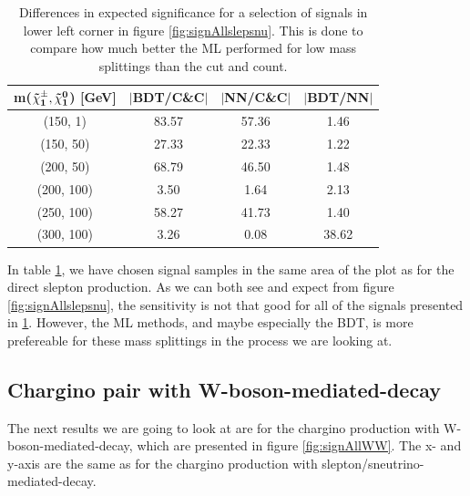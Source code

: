 \begin{table}[H]
    \centering
    \begin{tabular}{c c c c}
    \toprule
    \textbf{m($\mathbf{\Tilde{\chi}_1^\pm, \Tilde{\chi}_1^0}$) [GeV]} & \textbf{$|$BDT/C\&C$|$} & \textbf{$|$NN/C\&C$|$} &\textbf{$|$BDT/NN$|$}\\
    \midrule
    \midrule
        (150, 1)     & 83.57    & 57.36     & 1.46  \\
        (150, 50)    & 27.33    & 22.33     & 1.22  \\
        (200, 50)    & 68.79    & 46.50     & 1.48  \\  
        (200, 100)   & 3.50     & 1.64      & 2.13  \\
        (250, 100)   & 58.27    & 41.73     & 1.40  \\
        (300, 100)   & 3.26     & 0.08      & 38.62  \\
    \bottomrule
    \end{tabular}
    \caption{Differences in expected significance for a selection of signals in lower left corner in figure \ref{fig:signAllslepsnu}. This is done to compare how much better the ML performed for low mass splittings than the cut and count.}
    \label{tab:diffslepsnu}
\end{table}


In table \ref{tab:diffslepsnu}, we have chosen signal samples in the same area of the plot as for the direct slepton production. As we can both see and expect from figure \ref{fig:signAllslepsnu}, the sensitivity is not that good for all of the signals presented in \ref{tab:diffslepsnu}. However, the ML methods, and maybe especially the BDT, is more prefereable for these mass splittings in the process we are looking at. 






















\subsection{Chargino pair with W-boson-mediated-decay}
\label{sec:resC1C1_WW}

The next results we are going to look at are for the chargino production with W-boson-mediated-decay, which are presented in figure \ref{fig:signAllWW}. The x- and y-axis are the same as for the chargino production with slepton/sneutrino-mediated-decay. 

